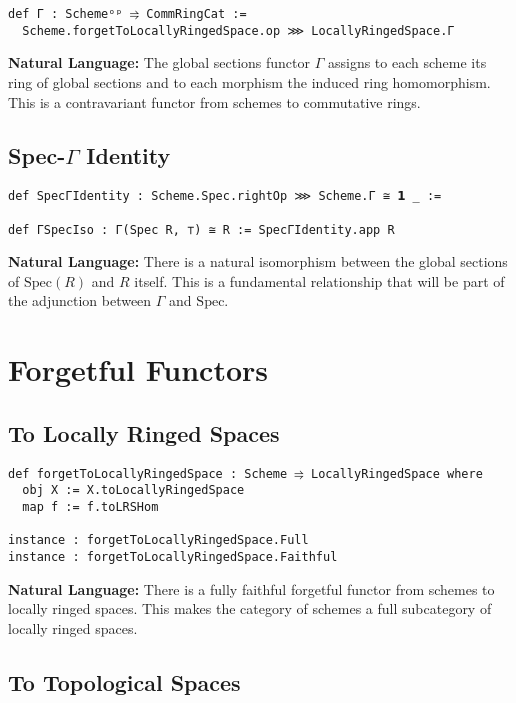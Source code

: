 \documentclass{article}
\theoremstyle{definition}
\begin{document}
\begin{lstlisting}
def Γ : Schemeᵒᵖ ⥤ CommRingCat :=
  Scheme.forgetToLocallyRingedSpace.op ⋙ LocallyRingedSpace.Γ
\end{lstlisting}

\textbf{Natural Language:} The global sections functor $\Gamma$ assigns to each scheme its ring of global sections and to each morphism the induced ring homomorphism. This is a contravariant functor from schemes to commutative rings.

\subsection{Spec-$\Gamma$ Identity}

\begin{lstlisting}
def SpecΓIdentity : Scheme.Spec.rightOp ⋙ Scheme.Γ ≅ 𝟭 _ :=

def ΓSpecIso : Γ(Spec R, ⊤) ≅ R := SpecΓIdentity.app R
\end{lstlisting}

\textbf{Natural Language:} There is a natural isomorphism between the global sections of $\mathrm{Spec}(R)$ and $R$ itself. This is a fundamental relationship that will be part of the adjunction between $\Gamma$ and $\mathrm{Spec}$.

\section{Forgetful Functors}

\subsection{To Locally Ringed Spaces}

\begin{lstlisting}
def forgetToLocallyRingedSpace : Scheme ⥤ LocallyRingedSpace where
  obj X := X.toLocallyRingedSpace
  map f := f.toLRSHom

instance : forgetToLocallyRingedSpace.Full
instance : forgetToLocallyRingedSpace.Faithful
\end{lstlisting}

\textbf{Natural Language:} There is a fully faithful forgetful functor from schemes to locally ringed spaces. This makes the category of schemes a full subcategory of locally ringed spaces.

\subsection{To Topological Spaces}
\end{document}
